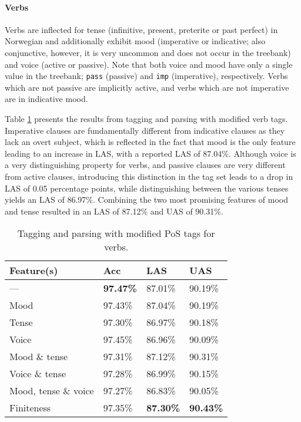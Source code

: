 \documentclass[11pt,a4paper]{article}
\begin{document}
\paragraph{Verbs}
Verbs are inflected for tense (infinitive, present, preterite or past perfect)
in Norwegian and additionally exhibit mood (imperative or indicative; also
conjunctive, however, it is very uncommon and does not occur in the treebank)
and voice (active or passive). Note that both voice and mood have only a single
value in the treebank; \texttt{pass} (passive) and \texttt{imp} (imperative),
respectively. Verbs which are not passive are implicitly active, and verbs
which are not imperative are in indicative mood.

Table \ref{verbresults} presents the results from tagging and parsing with
modified verb tags. Imperative clauses are fundamentally different from
indicative clauses as they lack an overt subject, which is reflected in the
fact that mood is the only feature leading to an increase in LAS, with a
reported LAS of 87.04\%. Although voice is a very distinguishing property for
verbs, and passive clauses are very different from active clauses, introducing
this distinction in the tag set leads to a drop in LAS of 0.05 percentage
points, while distinguishing between the various tenses yields an LAS of
86.97\%. Combining the two most promising features of mood and tense resulted
in an LAS of 87.12\% and UAS of 90.31\%.

\begin{table}
    \centering
    \smaller[0.5]
    \begin{tabular}{@{}llll@{}}
        \toprule
        \textbf{Feature(s)} & \textbf{Acc} & \textbf{LAS} & \textbf{UAS} \\
        \midrule
        --- & \textbf{97.47\%} & 87.01\% & 90.19\% \\
        Mood & 97.43\% & 87.04\% & 90.19\% \\
        Tense & 97.30\% & 86.97\% & 90.18\% \\
        Voice & 97.45\% & 86.96\% & 90.09\% \\
        Mood \& tense & 97.31\% & 87.12\% & 90.31\% \\
        Voice \& tense & 97.28\% & 86.99\% & 90.15\% \\
        Mood, tense \& voice & 97.27\% & 86.83\% & 90.05\% \\
        Finiteness & 97.35\% & \textbf{87.30\%} & \textbf{90.43\%} \\
        \bottomrule
    \end{tabular}
    \caption{Tagging and parsing with modified PoS tags for verbs.}
    \label{verbresults}
\end{table}
\end{document}
